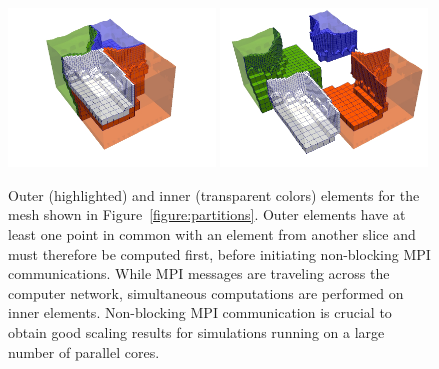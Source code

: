 \documentclass[referee,extra]{gji}
\begin{document}
\begin{figure}
\includegraphics[width=0.49\textwidth]{./images/mesh_inner_outer.jpg}
\includegraphics[width=0.49\textwidth]{./images/mesh_inner_outer2.jpg}
\caption{
Outer (highlighted) and inner (transparent colors) elements for the mesh shown in
Figure~\ref{figure:partitions}. Outer elements have at least one point in common with an element
from another slice and must therefore be computed first, before initiating non-blocking MPI
communications.
While MPI messages are traveling across the computer network,
simultaneous computations are performed on inner elements.
Non-blocking MPI communication is crucial to obtain good scaling
results for simulations running on a large number of parallel cores.}
\label{inner_outer_elements}
\end{figure}
\end{document}
